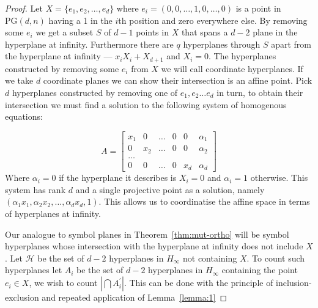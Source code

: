 \documentclass{article}
\newcommand{\PG}{\mathrm{PG}}
\begin{document}
\begin{proof}
  Let \(X = \{e_{1}, e_{2}, \ldots, e_{d}\}\) where \(e_{i} = (0, 0, \ldots, 1, 0, \ldots, 0)\) is a point in \(\PG(d, n)\) having a 1 in the \(i\)th position and zero everywhere else.
  By removing some \(e_i\) we get a subset \(S\) of \(d - 1\) points in \(X\) that spans a \(d - 2\) plane in the hyperplane at infinity. Furthermore there are \(q\) hyperplanes through \(S\) apart from the hyperplane at infinity --- \(x_i X_i + X_{d + 1}\) and \(X_{i} = 0\).
  The hyperplanes constructed by removing some \(e_i\) from \(X\) we will call coordinate hyperplanes. If we take \(d\) coordinate planes we can show their intersection is an affine point. Pick \(d\) hyperplanes constructed by removing one of \(e_1, e_2 \ldots e_d\) in turn,
  to obtain their intersection we must find a solution to the following system of homogenous equations:

  \begin{equation*}
    A = \begin{bmatrix}
      x_1 & 0 & \ldots & 0 & 0 & \alpha_1 \\
      0 & x_2 & \ldots & 0 & 0 & \alpha_2 \\
      \ldots \\
      0 & 0 & \ldots & 0 & x_d & \alpha_d
    \end{bmatrix}
  \end{equation*}
  Where \(\alpha_i = 0\) if the hyperplane it describes is \(X_i = 0\) and \(\alpha_i = 1\) otherwise.
  This system has rank \(d\) and a single projective point as a solution, namely \((\alpha_1 x_1, \alpha_2 x_2, \ldots, \alpha_d x_d, 1)\). This allows us to coordinatise the affine space in terms of
  hyperplanes at infinity.

  Our analogue to symbol planes in Theorem~\ref{thm:mut-ortho} will be symbol hyperplanes whose intersection with the hyperplane at infinity does not include \(X\). Let \(\mathcal{H}\) be the set of \(d - 2\) hyperplanes in \(H_{\infty}\) not containing \(X\). To count such hyperplanes let
  \(A_{i}\) be the set of \(d - 2\) hyperplanes in \(H_{\infty}\) containing the point \(e_{i} \in X\), we wish to count \(|\bigcap A^{\prime}_{i}|\). This can be done with the principle of inclusion-exclusion and repeated application of Lemma~\ref{lemma:1}


\end{proof}
\end{document}
